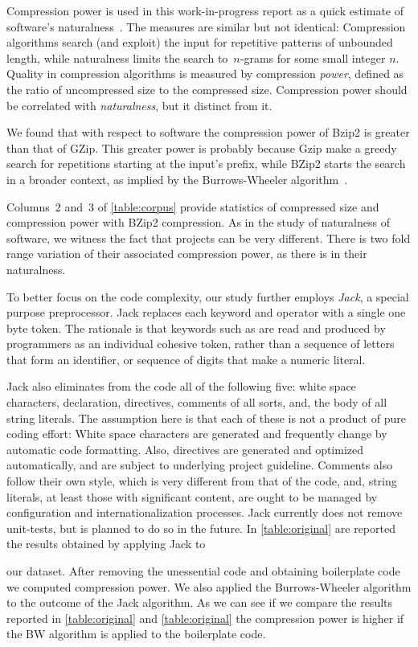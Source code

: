 Compression power is used in this work-in-progress report as a quick estimate
of software's naturalness~\cite{Hindle:Bar:Su:Gabel:Devanbu:2012}.  The
measures are similar but not identical: Compression algorithms search
(and exploit) the input for repetitive patterns of unbounded length, while
naturalness limits the search to~$n$-grams for some small integer $n$.  Quality
in compression algorithms is measured by compression \emph{power}, defined as
the ratio of uncompressed size to the compressed size. Compression power should
be correlated with \emph{naturalness}, but it distinct from it.

We found that with respect to \Java software the compression power of Bzip2 is
greater than that of GZip. This greater power is probably because Gzip make a
greedy search for repetitions starting at the input's prefix, while BZip2
starts the search in a broader context, as implied by the Burrows-Wheeler
algorithm~\cite{Burrows:Wheeler:94}.

Columns~2 and~3 of \cref{table:corpus} provide statistics of compressed size and
compression power with BZip2 compression. As in the
study of naturalness of software, we witness the fact that projects can be very 
different. There is two fold range variation of their associated compression
power, as there is in their naturalness.

To better focus on the code complexity, our study further employs \emph{Jack},
a special purpose preprocessor. Jack replaces each keyword and operator with a
single one byte token. The rationale is that keywords such as  are
read and produced by programmers as an individual cohesive token, rather than a
sequence of letters that form an identifier, or sequence of digits that make a
numeric literal.

Jack also eliminates from the \Java code all of the following five: white space
characters,  declaration,  directives, comments of all
sorts, and, the body of all string literals.  The assumption here is that each
of these is not a product of pure coding effort: White space characters are
generated and frequently change by automatic code formatting. Also, 
directives are generated and optimized automatically, and are subject to
underlying project guideline. Comments also follow their own style, which is
very different from that of the code, and, string literals, at least those with
significant content, are ought to be managed by configuration and
internationalization processes. Jack currently does not remove unit-tests, but
is planned to do so in the future.
In \cref{table:original} are reported the results obtained by applying Jack to
  \par\vspace{10pt plus 6pt minus 4pt}
our dataset. After removing the unessential code and obtaining boilerplate
code we computed compression power. We also applied the Burrows-Wheeler
algorithm to the outcome of the Jack algorithm. As we can see if we compare
the results reported in \cref{table:original} and \cref{table:original} the
compression power is higher if the BW algorithm is applied to the boilerplate
code.

